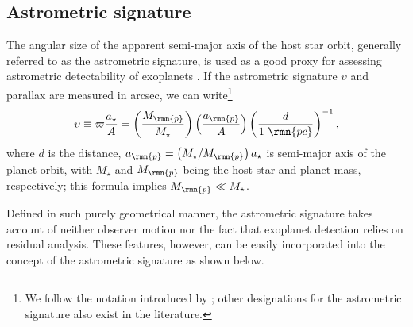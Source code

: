 \documentclass[fleqn,usenatbib,useAMS,usedcolumn]{mnras}
\begin{document}
\subsection{Astrometric signature}
\label{ss:signature}

The angular size of the apparent semi-major axis of the host star orbit, generally referred to as the astrometric signature, is used as a good proxy for assessing astrometric detectability of exoplanets \citep[e.g.,][]{Lattanzi+2000,Casertano+2008,Perryman2011,Perryman+2014,Sozzetti+2014,2017arXiv1704.02493}. If the astrometric signature $\upsilon$ and parallax are measured in arcsec, we can write\footnote{We follow the notation introduced by \cite{2017arXiv1704.02493}; other designations for the astrometric signature also exist in the literature.}
\begin{equation}\label{eq:astr-sig-geom}
  \upsilon\equiv\varpi\frac{a_\star}{A}=
  \left(\frac{M_\rmn{p}}{M_\star}\right)
  \left(\frac{a_\rmn{p}}{A}\right)
  \left(\frac{d}{1\ \rmn{pc}}\right)^{-1},
\end{equation}
where $d$ is the distance, $a_\rmn{p}=\left(M_\star/M_\rmn{p}\right)a_\star$ is semi-major axis of the planet orbit, with $M_\star$ and $M_\rmn{p}$ being the host star and planet mass, respectively; this formula implies $M_\rmn{p}\ll M_\star$.

Defined in such purely geometrical manner, the astrometric signature takes account of neither observer motion nor the fact that exoplanet detection relies on residual analysis. These features, however, can be easily incorporated into the concept of the astrometric signature as shown below.
\end{document}
